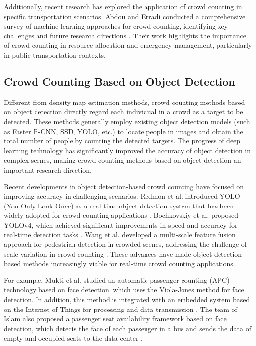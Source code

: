 Additionally, recent research has explored the application of crowd counting in specific transportation scenarios. Abdou and Erradi conducted a comprehensive survey of machine learning approaches for crowd counting, identifying key challenges and future research directions \cite{03_abdou_crowd_2020}. Their work highlights the importance of crowd counting in resource allocation and emergency management, particularly in public transportation contexts.

\subsection{Crowd Counting Based on Object Detection}
Different from density map estimation methods, crowd counting methods based on object detection directly regard each individual in a crowd as a target to be detected. These methods generally employ existing object detection models (such as Faster R-CNN, SSD, YOLO, etc.) to locate people in images and obtain the total number of people by counting the detected targets. The progress of deep learning technology has significantly improved the accuracy of object detection in complex scenes, making crowd counting methods based on object detection an important research direction.

Recent developments in object detection-based crowd counting have focused on improving accuracy in challenging scenarios. Redmon et al. introduced YOLO (You Only Look Once) as a real-time object detection system that has been widely adopted for crowd counting applications \cite{redmon2016you}. Bochkovskiy et al. proposed YOLOv4, which achieved significant improvements in speed and accuracy for real-time detection tasks \cite{bochkovskiy2020yolov4}. Wang et al. developed a multi-scale feature fusion approach for pedestrian detection in crowded scenes, addressing the challenge of scale variation in crowd counting \cite{wang2019multiscale}. These advances have made object detection-based methods increasingly viable for real-time crowd counting applications.

For example, Mukti et al. studied an automatic passenger counting (APC) technology based on face detection, which uses the Viola-Jones method for face detection. In addition, this method is integrated with an embedded system based on the Internet of Things for processing and data transmission \cite{43_mukti_pemodelan_2021}. The team of Islam also proposed a passenger seat availability framework based on face detection, which detects the face of each passenger in a bus and sends the data of empty and occupied seats to the data center \cite{24_islam_framework_2020}.

